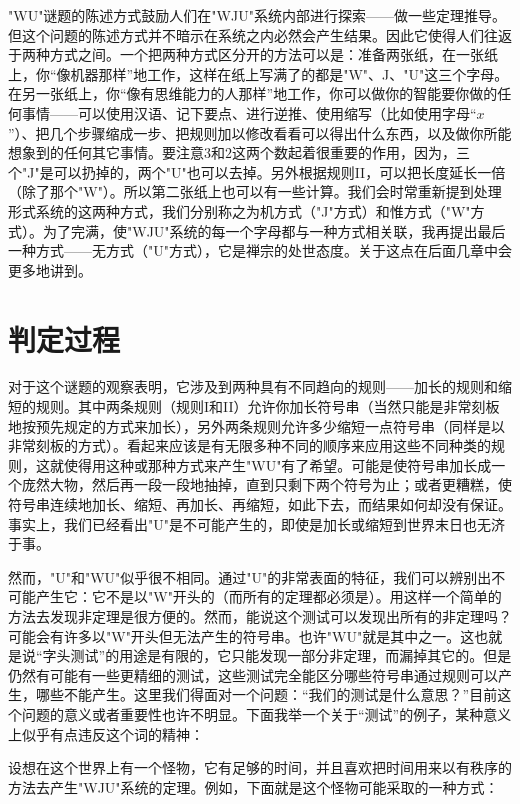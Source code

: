 "WU"谜题的陈述方式鼓励人们在"WJU"系统内部进行探索——做一些定理推导。但这个问题的陈述方式并不暗示在系统之内必然会产生结果。因此它使得人们往返于两种方式之间。一个把两种方式区分开的方法可以是：准备两张纸，在一张纸上，你“像机器那样”地工作，这样在纸上写满了的都是"W"、J、"U"这三个字母。在另一张纸上，你“像有思维能力的人那样”地工作，你可以做你的智能要你做的任何事情——可以使用汉语、记下要点、进行逆推、使用缩写（比如使用字母“$x$”）、把几个步骤缩成一步、把规则加以修改看看可以得出什么东西，以及做你所能想象到的任何其它事情。要注意$3$和$2$这两个数起着很重要的作用，因为，三个"J"是可以扔掉的，两个"U"也可以去掉。另外根据规则II，可以把长度延长一倍（除了那个"W"）。所以第二张纸上也可以有一些计算。我们会时常重新提到处理形式系统的这两种方式，我们分别称之为机方式（"J"方式）和惟方式（"W"方式）。为了完满，使"WJU"系统的每一个字母都与一种方式相关联，我再提出最后一种方式——无方式（"U"方式），它是禅宗的处世态度。关于这点在后面几章中会更多地讲到。

\section{判定过程}

对于这个谜题的观察表明，它涉及到两种具有不同趋向的规则——加长的规则和缩短的规则。其中两条规则（规则I和II）允许你加长符号串（当然只能是非常刻板地按预先规定的方式来加长），另外两条规则允许多少缩短一点符号串（同样是以非常刻板的方式）。看起来应该是有无限多种不同的顺序来应用这些不同种类的规则，这就使得用这种或那种方式来产生"WU"有了希望。可能是使符号串加长成一个庞然大物，然后再一段一段地抽掉，直到只剩下两个符号为止；或者更糟糕，使符号串连续地加长、缩短、再加长、再缩短，如此下去，而结果如何却没有保证。事实上，我们已经看出"U"是不可能产生的，即使是加长或缩短到世界末日也无济于事。

然而，"U"和"WU"似乎很不相同。通过"U"的非常表面的特征，我们可以辨别出不可能产生它：它不是以"W"开头的（而所有的定理都必须是）。用这样一个简单的方法去发现非定理是很方便的。然而，能说这个测试可以发现出所有的非定理吗？可能会有许多以"W"开头但无法产生的符号串。也许"WU"就是其中之一。这也就是说“字头测试”的用途是有限的，它只能发现一部分非定理，而漏掉其它的。但是仍然有可能有一些更精细的测试，这些测试完全能区分哪些符号串通过规则可以产生，哪些不能产生。这里我们得面对一个问题：“我们的测试是什么意思？”目前这个问题的意义或者重要性也许不明显。下面我举一个关于“测试”的例子，某种意义上似乎有点违反这个词的精神：

设想在这个世界上有一个怪物，它有足够的时间，并且喜欢把时间用来以有秩序的方法去产生"WJU"系统的定理。例如，下面就是这个怪物可能采取的一种方式：

